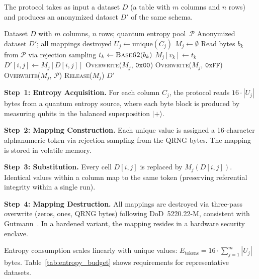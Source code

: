 \documentclass[acmsmall,screen,review,anonymous]{acmart}
\begin{document}
The protocol takes as input a dataset $D$ (a table with $m$ columns and $n$ rows) and produces an anonymized dataset $D'$ of the same schema.

\begin{algorithm}[t]
\caption{QRNG-OTP-Destroy}
\label{alg:qrng_otp}
\begin{algorithmic}[1]
\REQUIRE Dataset $D$ with $m$ columns, $n$ rows; quantum entropy pool~$\mathcal{P}$
\ENSURE Anonymized dataset $D'$; all mappings destroyed
    \STATE $U_j \leftarrow \text{unique}(C_j)$
    \STATE $M_j \leftarrow \emptyset$
        \STATE Read bytes $b_k$ from $\mathcal{P}$ via rejection sampling
        \STATE $t_k \leftarrow \textsc{Base62}(b_k)$ 
        \STATE $M_j[v_k] \leftarrow t_k$
    \ENDFOR
        \STATE $D'[i,j] \leftarrow M_j[D[i,j]]$
    \ENDFOR
\ENDFOR
{}
    \STATE \textsc{Overwrite}($M_j$, $\texttt{0x00}$) 
    \STATE \textsc{Overwrite}($M_j$, $\texttt{0xFF}$) 
    \STATE \textsc{Overwrite}($M_j$, $\mathcal{P}$) 
    \STATE \textsc{Release}($M_j$)
\ENDFOR
\RETURN $D'$
\end{algorithmic}
\end{algorithm}

\textbf{Step~1: Entropy Acquisition.} For each column $C_j$, the protocol reads $16 \cdot |U_j|$ bytes from a quantum entropy source, where each byte block is produced by measuring qubits in the balanced superposition $|{+}\rangle$.

\textbf{Step~2: Mapping Construction.} Each unique value is assigned a 16-character alphanumeric token via rejection sampling from the QRNG bytes. The mapping is stored in volatile memory.

\textbf{Step~3: Substitution.} Every cell $D[i,j]$ is replaced by $M_j(D[i,j])$. Identical values within a column map to the same token (preserving referential integrity within a single run).

\textbf{Step~4: Mapping Destruction.} All mappings are destroyed via three-pass overwrite (zeros, ones, QRNG bytes) following DoD~5220.22-M, consistent with Gutmann~\cite{gutmann1996secure}. In a hardened variant, the mapping resides in a hardware security enclave.

Entropy consumption scales linearly with unique values:
$E_{\mathrm{tokens}} = 16 \cdot \sum_{j=1}^{m} |U_j|$ bytes.
Table~\ref{tab:entropy_budget} shows requirements for representative datasets.
\end{document}
